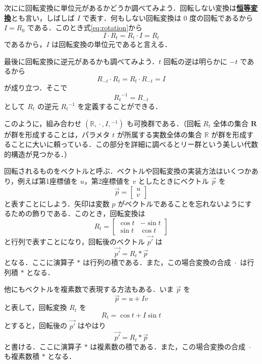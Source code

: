 \documentclass[a4paper,twocolumn]{jsbook}
\newcommand{\keyword}[1]{{\underline{\textbf{#1}}}}
\DeclareMathOperator{\mCompRot}{\cdot}
\newcommand{\mSet}[1]{\mathbf{#1}}
\newcommand{\mSpecialSet}[1]{\mathbb{#1}} %
\newcommand{\mRSet}{\mSpecialSet{R}}
\newcommand{\mTupleWith}[1]{\left(#1\right)}
\newcommand{\mVec}[1]{\Vec{#1}}
\begin{document}
次にに回転変換に単位元があるかどうか調べてみよう．回転しない変換は\keyword{恒等変換}とも言い，しばしば $I$ で表す．何もしない回転変換は $0$ 度の回転であるから $I=R_0$ である．このとき式\eqref{eq:rotation}から
\begin{equation}
I\mCompRot R_t=R_t\mCompRot I=R_t
\end{equation}
であるから，$I$ は回転変換の単位元であると言える．

最後に回転変換に逆元があるかも調べてみよう．$t$ 回転の逆は明らかに $-t$ であるから
\begin{equation}
R_{-t}\mCompRot R_t=R_t\mCompRot R_{-t}=I
\end{equation}
が成り立つ．そこで
\begin{equation}
{R_t}^{-1}=R_{-t}
\end{equation}
として $R_t$ の逆元 ${R_t}^{-1}$ を定義することができる．

このように，組み合わせ $\mTupleWith{\mRSet,\mCompRot,I,{}^{-1}}$ も可換群である．（回転 $R_t$ 全体の集合 $\mSet{R}$ が群を形成することは，パラメタ $t$ が所属する実数全体の集合 $\mRSet$ が群を形成することに大いに頼っている．この部分を詳細に調べるとリー群という美しい代数的構造が見つかる．）

回転されるものをベクトルと呼ぶ．ベクトルや回転変換の実装方法はいくつかあり，例えば第1座標値を $u$，第2座標値を $v$ としたときにベクトル $\mVec{p}$ を
\begin{equation}
\mVec{p}=\begin{bmatrix}u\\v\end{bmatrix}
\end{equation}
と表すことにしよう．矢印は変数 $p$ がベクトルであることを忘れないようにするための飾りである．このとき，回転変換は
\begin{equation}
R_t=\begin{bmatrix}\cos t&-\sin t\\\sin t&\cos t\end{bmatrix}
\end{equation}
と行列で表すことになり，回転後のベクトル $\mVec{p'}$ は
\begin{equation}
\mVec{p'}=R_t*\mVec{p}
\end{equation}
となる．ここに演算子 $*$ は行列の積である．また，この場合変換の合成 $\mCompRot$ は行列積 $*$ となる．

他にもベクトルを複素数で表現する方法もある．いま $\mVec{p}$ を
\begin{equation}
\mVec{p}=u+I v
\end{equation}
と表して，回転変換 $R_t$ を
\begin{equation}
R_t=\cos t+I\sin t
\end{equation}
とすると，回転後の $\mVec{p'}$ はやはり
\begin{equation}
\mVec{p'}=R_t*\mVec{p}
\end{equation}
と書ける．ここに演算子 $*$ は複素数の積である．また，この場合変換の合成 $\mCompRot$ も複素数積 $*$ となる．
\end{document}
